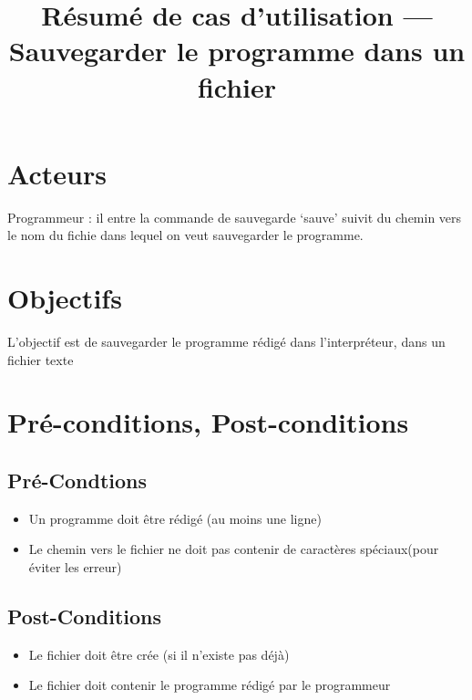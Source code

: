 \documentclass[12pt,a4paper]{article}
\title{Résumé de cas d'utilisation --- Sauvegarder le programme dans un fichier}
\date{} %
\author{} %
\begin{document}
        \maketitle

        \section{Acteurs}
        Programmeur : il entre la commande de sauvegarde `sauve' suivit du chemin vers le nom du fichie dans lequel on veut sauvegarder le programme.

        \section{Objectifs}
        L'objectif est de sauvegarder le programme rédigé dans l'interpréteur, dans un fichier texte 

        \section{Pré-conditions, Post-conditions}

            \subsection{Pré-Condtions}
            \begin{itemize}
            	\item Un programme doit être rédigé (au moins une ligne)
            	\item Le chemin vers le fichier ne doit pas contenir de caractères spéciaux(pour éviter les erreur)
        	\end{itemize}

            \subsection{Post-Conditions}
            \begin{itemize}
            	\item Le fichier doit être crée (si il n'existe pas déjà)
            	\item Le fichier doit contenir le programme rédigé par le programmeur
            \end{itemize}
\end{document}
